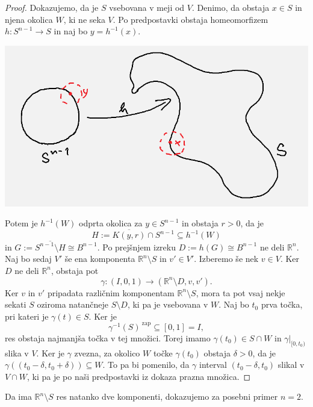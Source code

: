 \documentclass[10pt, a4paper]{article}
\newenvironment{noticeC}{%
  \tcolorbox[%
  notitle,
  empty,
  enhanced,  %
  breakable,
  coltext=black, 
  fontupper=\rmfamily,
  noparskip,
  sharp corners,
  boxrule=-1pt,  %
  frame hidden,
  left=7pt,  %
  right=7pt,
  top=5pt,
  bottom=5pt,
  before skip=2.5ex plus 2pt,
  after skip=2.5ex plus 2pt,
  overlay unbroken and last={%
  },
  ]}
{\endtcolorbox}
\newenvironment{dokaz}%
  {\begin{noticeC}\begin{proof}}%
  {\end{proof}\end{noticeC}}
\newcommand{\R}{\mathbb {R}}
\begin{document}
\begin{dokaz}
  Dokazujemo, da je $S$ vsebovana v meji od $V$. Denimo, da obstaja $x \in S$ in njena okolica $W$, ki ne seka $V$.
  Po predpostavki obstaja homeomorfizem $h: S^{n - 1} \to S$ in naj bo $y = h^{-1} (x)$.
  \begin{center}
    \includegraphics[scale=0.5]{dokaz4.png}
  \end{center}
  Potem je $h^{-1} (W)$ odprta okolica za $y \in S^{n - 1}$ in obstaja $r > 0$, da je 
  $$H := \overline{K(y, r)} \cap S^{n - 1} \subseteq h^{-1} (W)$$ in $G := \overline{S^{n - 1} \setminus H} \cong B^{n - 1}.$
  Po prejšnjem izreku $D := h(G) \cong B^{n - 1}$ ne deli $\R^n$. Naj bo sedaj $V'$ še ena komponenta $\R^n \setminus S$
  in $v' \in V'$. Izberemo še nek $v \in V$. Ker $D$ ne deli $\R^n$, obstaja pot 
  $$\gamma: (I, 0, 1) \to (\R^n \setminus D, v, v').$$
  Ker $v$ in $v'$ pripadata različnim komponentam $\R^n \setminus S$, mora ta pot vsaj nekje sekati $S$ oziroma natančneje 
  $S \setminus D$, ki pa je vsebovana v $W$. Naj bo $t_0$ prva točka, pri kateri je $\gamma (t) \in S$.
  Ker je $$\gamma^{-1} (S)^{\ \text{zap}} \subseteq [0, 1] = I,$$
  res obstaja najmanjša točka v tej množici.
  Torej imamo $\gamma(t_0) \in S \cap W$ in $\gamma\big|_{[0, t_0)}$ slika v $V$.
  Ker je $\gamma$ zvezna, za okolico $W$ točke $\gamma(t_0)$ obstaja $\delta > 0$, da je 
  $\gamma((t_0 - \delta, t_0 + \delta)) \subseteq W$. To pa bi pomenilo, da $\gamma$ interval $(t_0 - \delta, t_0)$
  slikal v $V \cap W$, ki pa je po naši predpostavki iz dokaza prazna množica.
\end{dokaz}

Da ima $\R^n \setminus S$ res natanko dve komponenti, dokazujemo za posebni primer $n = 2$.
\end{document}
